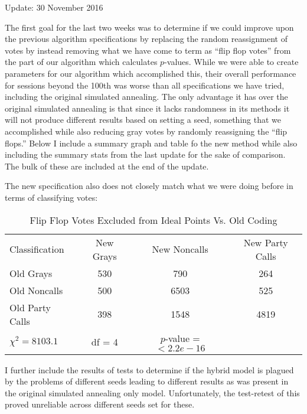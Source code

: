 \documentclass[12pt]{article}
\begin{document}
	
	\begin{center}
		Update: 30 November 2016
	\end{center}

The first goal for the last two weeks was to determine if we could improve upon the previous algorithm specifications by replacing the random reassignment of votes by instead removing what we have come to term as ``flip flop votes'' from the part of our algorithm which calculates $p$-values. While we were able to create parameters for our algorithm which accomplished this, their overall performance for sessions beyond the 100th was worse than all specifications we have tried, including the original simulated annealing. The only advantage it has over the original simulated annealing is that since it lacks randomness in its methods it will not produce different results based on setting a seed, something that we accomplished while also reducing gray votes by randomly reassigning the ``flip flops.'' Below I include a summary graph and table fo the new method while also including the summary stats from the last update for the sake of comparison. The bulk of these are included at the end of the update.

The new specification also does not closely match what we were doing before in terms of classifying votes:

	\begin{table}[!ht]
		\centering
		\caption{Flip Flop Votes Excluded from Ideal Points Vs. Old Coding}
		\begin{tabular}{l c c c}
			\hline
            \hline
            Classification &  New Grays & New Noncalls & New Party Calls \\
            Old Grays      &  530   &  790    &    264 \\
            Old Noncalls  &   500  &  6503    &    525 \\
            Old Party Calls & 398   & 1548    &   4819 \\
            \hline
            $ \chi^{2} = 8103.1 $ & df = 4 & $p$-value = $< 2.2e-16$ & \\
            
   		\end{tabular}
   	\end{table}

I further include the results of tests to determine if the hybrid model is plagued by the problems of different seeds leading to different results as was present in the original simulated annealing only model. Unfortunately, the test-retest of this proved unreliable across different seeds set for these.
\end{document}
